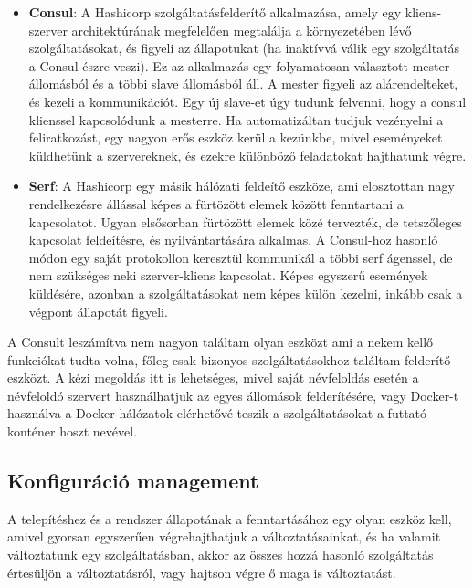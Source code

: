 \documentclass[11pt,magyar,a4paper,twoside,]{report}
\begin{document}
\begin{itemize}
\item
  \textbf{Consul}\citep{consul}: A Hashicorp szolgáltatásfelderítő
  alkalmazása, amely egy kliens-szerver architektúrának megfelelően
  megtalálja a környezetében lévő szolgáltatásokat, és figyeli az
  állapotukat (ha inaktívvá válik egy szolgáltatás a Consul észre
  veszi). Ez az alkalmazás egy folyamatosan választott mester állomásból
  és a többi slave állomásból áll. A mester figyeli az alárendelteket,
  és kezeli a kommunikációt. Egy új slave-et úgy tudunk felvenni, hogy a
  consul klienssel kapcsolódunk a mesterre. Ha automatizáltan tudjuk
  vezényelni a feliratkozást, egy nagyon erős eszköz kerül a kezünkbe,
  mivel eseményeket küldhetünk a szervereknek, és ezekre különböző
  feladatokat hajthatunk végre.
\item
  \textbf{Serf}\citep{serf}: A Hashicorp egy másik hálózati feldeítő
  eszköze, ami elosztottan nagy rendelkezésre állással képes a fürtözött
  elemek között fenntartani a kapcsolatot. Ugyan elsősorban fürtözött
  elemek közé tervezték, de tetszőleges kapcsolat feldeítésre, és
  nyilvántartására alkalmas. A Consul-hoz hasonló módon egy saját
  protokollon keresztül kommunikál a többi serf ágenssel, de nem
  szükséges neki szerver-kliens kapcsolat. Képes egyszerű események
  küldésére, azonban a szolgáltatásokat nem képes külön kezelni, inkább
  csak a végpont állapotát figyeli.
\end{itemize}

A Consult leszámítva nem nagyon találtam olyan eszközt ami a nekem kellő
funkciókat tudta volna, főleg csak bizonyos szolgáltatásokhoz találtam
felderítő eszközt. A kézi megoldás itt is lehetséges, mivel saját
névfeloldás esetén a névfeloldó szervert használhatjuk az egyes
állomások felderítésére, vagy Docker-t használva a Docker hálózatok
elérhetővé teszik a szolgáltatásokat a futtató konténer hoszt nevével.

\subsection{Konfiguráció
management}\label{konfiguruxe1ciuxf3-management}

A telepítéshez és a rendszer állapotának a fenntartásához egy olyan
eszköz kell, amivel gyorsan egyszerűen végrehajthatjuk a
változtatásainkat, és ha valamit változtatunk egy szolgáltatásban, akkor
az összes hozzá hasonló szolgáltatás értesüljön a változtatásról, vagy
hajtson végre ő maga is változtatást.
\end{document}
